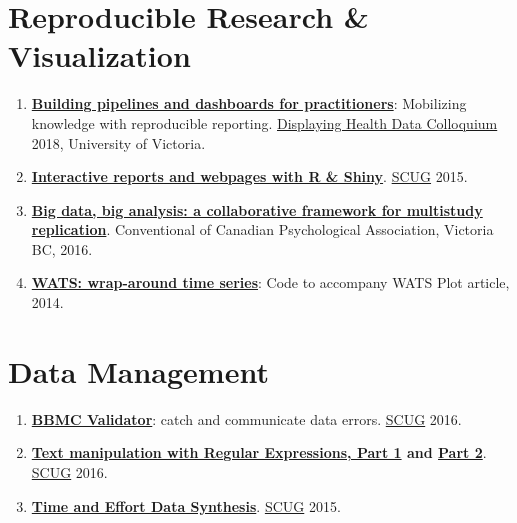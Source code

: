 \documentclass[
]{book}
\providecommand{\tightlist}{%
  \setlength{\itemsep}{0pt}\setlength{\parskip}{0pt}}
\begin{document}
\hypertarget{reproducible-research-visualization}{%
\section{Reproducible Research \& Visualization}\label{reproducible-research-visualization}}

\begin{enumerate}
\def\labelenumi{\arabic{enumi}.}
\tightlist
\item
  \textbf{\href{https://github.com/dss-ialh/displaying-health-data/blob/master/documentation/products/beasley/dhd-2018-uvic-3-a-beasley-2018-11-29.pdf}{Building pipelines and dashboards for practitioners}}: Mobilizing knowledge with reproducible reporting. \href{https://github.com/dss-ialh/displaying-health-data}{Displaying Health Data Colloquium} 2018, University of Victoria.
\item
  \textbf{\href{https://rawgit.com/OuhscBbmc/StatisticalComputing/master/2015_Presentations/10_October/beasley-scug-shiny-2015-10.html\#/}{Interactive reports and webpages with R \& Shiny}}. \href{https://github.com/OuhscBbmc/StatisticalComputing}{SCUG} 2015.
\item
  \textbf{\href{https://github.com/IALSA/IALSA-2015-Portland/blob/master/pubs/2016-talks/2016-06-09-cpa/ppt/koval-etal-2016-06-10-cpa.pdf}{Big data, big analysis: a collaborative framework for multistudy replication}}. Conventional of Canadian Psychological Association, Victoria BC, 2016.
\item
  \textbf{\href{https://github.com/OuhscBbmc/Wats}{WATS: wrap-around time series}}: Code to accompany WATS Plot article, 2014.
\end{enumerate}

\hypertarget{data-management}{%
\section{Data Management}\label{data-management}}

\begin{enumerate}
\def\labelenumi{\arabic{enumi}.}
\tightlist
\item
  \textbf{\href{https://rawgit.com/OuhscBbmc/StatisticalComputing/master/2016-presentations/11-november/beasley-scug-validator-2016-11.html\#/}{BBMC Validator}}: catch and communicate data errors. \href{https://github.com/OuhscBbmc/StatisticalComputing}{SCUG} 2016.
\item
  \textbf{\href{https://rawgit.com/OuhscBbmc/StatisticalComputing/master/2016-presentations/02-february/beasley-scug-regex-part-1-2016-02.html}{Text manipulation with Regular Expressions, Part 1} and \href{https://rawgit.com/OuhscBbmc/StatisticalComputing/master/2016-presentations/05-may/beasley-scug-regex-part-2-2016-05.html\#/}{Part 2}}. \href{https://github.com/OuhscBbmc/StatisticalComputing}{SCUG} 2016.
\item
  \textbf{\href{https://rawgit.com/wibeasley/RAnalysisSkeleton/master/documentation/time-and-effort-synthesis.html\#/}{Time and Effort Data Synthesis}}. \href{https://github.com/OuhscBbmc/StatisticalComputing}{SCUG} 2015.
\end{enumerate}
\end{document}
